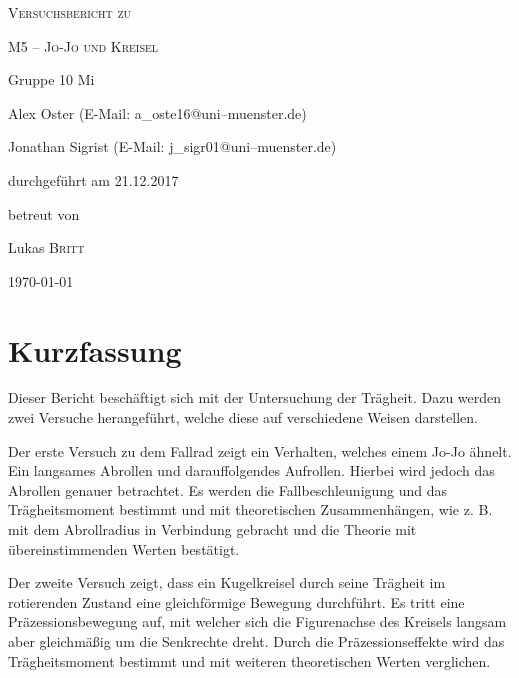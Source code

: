 \documentclass[11pt,a4paper,titlepage, ngerman]{article}
\begin{document}
	\begin{titlepage}
		\centering
		{\scshape\LARGE Versuchsbericht zu \par}
		\vspace{1cm}
		{\scshape\huge M5 -- Jo-Jo und Kreisel\par}
		\vspace{2.5cm}
		{\LARGE Gruppe 10 Mi\par}
		\vspace{0.5cm}
		{\large Alex Oster (E-Mail: a\_oste16@uni--muenster.de) \par}
		{\large Jonathan Sigrist (E-Mail: j\_sigr01@uni--muenster.de) \par}
		\vfill
		durchgeführt am 21.12.2017\par
		betreut von\par
		{\large Lukas \textsc{Britt}} 
		\vfill	
		{\large \today\par}
	\end{titlepage}
	
	\tableofcontents
	
	\newpage
	
	\section{Kurzfassung}
	
	
	Dieser Bericht beschäftigt sich mit der Untersuchung der Trägheit. Dazu werden zwei Versuche herangeführt, welche diese auf verschiedene Weisen darstellen.
	
	Der erste Versuch zu dem Fallrad zeigt ein Verhalten, welches einem Jo-Jo ähnelt. Ein langsames Abrollen und darauffolgendes Aufrollen. Hierbei wird jedoch das Abrollen genauer betrachtet. Es werden die Fallbeschleunigung und das Trägheitsmoment bestimmt und mit theoretischen Zusammenhängen, wie z. B. mit dem Abrollradius in Verbindung gebracht und die Theorie mit übereinstimmenden Werten bestätigt.
	
	Der zweite Versuch zeigt, dass ein Kugelkreisel durch seine Trägheit im rotierenden Zustand eine gleichförmige Bewegung durchführt.
	Es tritt eine Präzessionsbewegung auf, mit welcher sich die Figurenachse des Kreisels langsam aber gleichmäßig um die Senkrechte dreht.
	Durch die Präzessionseffekte wird das Trägheitsmoment bestimmt und mit weiteren theoretischen Werten verglichen.
			
	\vspace{2cm} 
	
\end{document}
